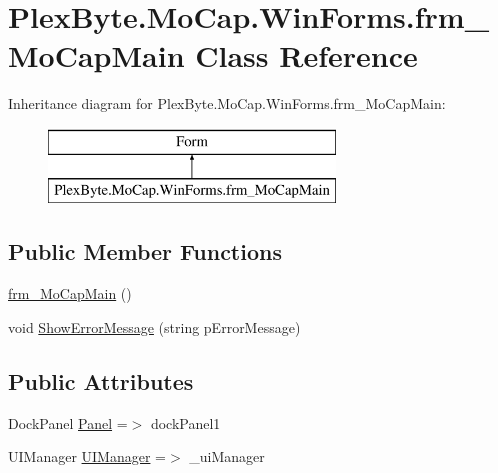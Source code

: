 \hypertarget{class_plex_byte_1_1_mo_cap_1_1_win_forms_1_1frm___mo_cap_main}{}\section{Plex\+Byte.\+Mo\+Cap.\+Win\+Forms.\+frm\+\_\+\+Mo\+Cap\+Main Class Reference}
\label{class_plex_byte_1_1_mo_cap_1_1_win_forms_1_1frm___mo_cap_main}
Inheritance diagram for Plex\+Byte.\+Mo\+Cap.\+Win\+Forms.\+frm\+\_\+\+Mo\+Cap\+Main\+:\begin{figure}[H]
\begin{center}
\leavevmode
\includegraphics[height=2.000000cm]{class_plex_byte_1_1_mo_cap_1_1_win_forms_1_1frm___mo_cap_main}
\end{center}
\end{figure}
\subsection*{Public Member Functions}
\begin{DoxyCompactItemize}
\item 
\hyperlink{class_plex_byte_1_1_mo_cap_1_1_win_forms_1_1frm___mo_cap_main_ad5e74126f5d02438095f3cccee647767}{frm\+\_\+\+Mo\+Cap\+Main} ()
\item 
void \hyperlink{class_plex_byte_1_1_mo_cap_1_1_win_forms_1_1frm___mo_cap_main_a53f66c824f18a754a20bfee1ef13873e}{Show\+Error\+Message} (string p\+Error\+Message)
\end{DoxyCompactItemize}
\subsection*{Public Attributes}
\begin{DoxyCompactItemize}
\item 
Dock\+Panel \hyperlink{class_plex_byte_1_1_mo_cap_1_1_win_forms_1_1frm___mo_cap_main_a523b01d4a9ec5573c7e42b439644c9ee}{Panel} =$>$ dock\+Panel1
\item 
U\+I\+Manager \hyperlink{class_plex_byte_1_1_mo_cap_1_1_win_forms_1_1frm___mo_cap_main_a33aa80ec18c499177631895f86eec5ba}{U\+I\+Manager} =$>$ \+\_\+ui\+Manager
\end{DoxyCompactItemize}
